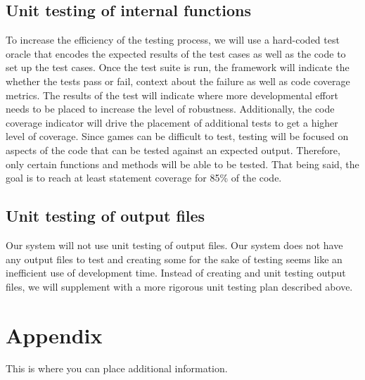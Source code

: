 \documentclass[12pt, titlepage]{article}
\begin{document}
	\subsection{Unit testing of internal functions}
	To increase the efficiency of the testing process, we will use a hard-coded test oracle that encodes the expected results of the test cases as well as the code to set up the test cases. Once the test suite is run, the framework will indicate the whether the tests pass or fail, context about the failure as well as code coverage metrics. The results of the test will indicate where more developmental effort needs to be placed to increase the level of robustness. Additionally, the code coverage indicator will drive the placement of additional tests to get a higher level of coverage. Since games can be difficult to test, testing will be focused on aspects of the code that can be tested against an expected output. Therefore, only certain functions and methods will be able to be tested. That being said, the goal is to reach at least statement coverage for 85\% of the code.
	
	\subsection{Unit testing of output files}	
	Our system will not use unit testing of output files. Our system does not have any output files to test and creating some for the sake of testing seems like an inefficient use of development time. Instead of creating and unit testing output files, we will supplement with a more rigorous unit testing plan described above.
	\newpage
	\section{Appendix}
	
	This is where you can place additional information.
	
\end{document}
